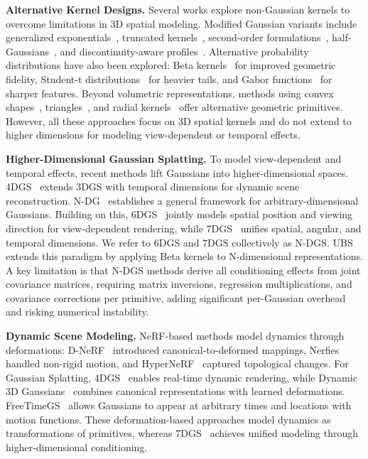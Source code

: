 \documentclass{article}
\theoremstyle{plain}
\theoremstyle{definition}
\theoremstyle{remark}
\begin{document}
\textbf{Alternative Kernel Designs.}
Several works explore non-Gaussian kernels to overcome limitations in 3D spatial modeling. Modified Gaussian variants include generalized exponentials~\cite{hamdi2024gesgeneralizedexponentialsplatting}, truncated kernels~\cite{liu2025tnt}, second-order formulations~\cite{zhang2025quadratic}, half-Gaussians~\cite{li20253d}, and discontinuity-aware profiles~\cite{qu2024disc}. Alternative probability distributions have also been explored: Beta kernels~\cite{liu2025deformable} for improved geometric fidelity, Student-t distributions~\cite{zhu20253dstudentsplattingscooping} for heavier tails, and Gabor functions~\cite{zhou20253dgabsplat3dgaborsplatting} for sharper features. Beyond volumetric representations, methods using convex shapes~\cite{held20243dconvexsplattingradiance}, triangles~\cite{held2025triangle}, and radial kernels~\cite{huang2025deformable} offer alternative geometric primitives. However, all these approaches focus on 3D spatial kernels and do not extend to higher dimensions for modeling view-dependent or temporal effects.

\textbf{Higher-Dimensional Gaussian Splatting.}
To model view-dependent and temporal effects, recent methods lift Gaussians into higher-dimensional spaces. 4DGS~\cite{yang2023real} extends 3DGS with temporal dimensions for dynamic scene reconstruction. N-DG~\cite{diolatzis2024n} establishes a general framework for arbitrary-dimensional Gaussians. Building on this, 6DGS~\cite{gao20246dgs} jointly models spatial position and viewing direction for view-dependent rendering, while 7DGS~\cite{gao20257dgs} unifies spatial, angular, and temporal dimensions. We refer to 6DGS and 7DGS collectively as N-DGS. UBS~\citep{liu2025universal} extends this paradigm by applying Beta kernels to N-dimensional representations. A key limitation is that N-DGS methods derive all conditioning effects from joint covariance matrices, requiring matrix inversions, regression multiplications, and covariance corrections per primitive, adding significant per-Gaussian overhead and risking numerical instability.

\textbf{Dynamic Scene Modeling.}
NeRF-based methods model dynamics through deformations: D-NeRF~\cite{pumarola2020dnerfneuralradiancefields} introduced canonical-to-deformed mappings, Nerfies~\cite{park2021nerfies} handled non-rigid motion, and HyperNeRF~\cite{park2021hypernerf} captured topological changes. For Gaussian Splatting, 4DGS~\cite{yang2023real} enables real-time dynamic rendering, while Dynamic 3D Gaussians~\cite{luiten2023dynamic} combines canonical representations with learned deformations. FreeTimeGS~\cite{wang2025freetimegs} allows Gaussians to appear at arbitrary times and locations with motion functions. These deformation-based approaches model dynamics as transformations of primitives, whereas 7DGS~\cite{gao20257dgs} achieves unified modeling through higher-dimensional conditioning.
\end{document}
